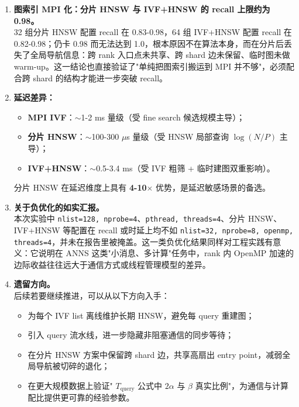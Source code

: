 \documentclass[a4paper]{article}
\begin{document}
\begin{enumerate}
    \item \textbf{图索引 MPI 化：分片 HNSW 与 IVF+HNSW 的 recall 上限约为 0.98。}\\
    32 组分片 HNSW 配置 recall 在 0.83-0.98，64 组 IVF+HNSW 配置 recall 在 0.82-0.98；仍卡 0.98 而无法达到 1.0，根本原因不在算法本身，而在分片后丢失了全局导航信息：跨 rank 入口点未共享、跨 shard 边未保留、临时图未做 warm-up。这一结论也直接验证了"单纯把图索引搬运到 MPI 并不够"，必须配合跨 shard 的结构才能进一步突破 recall。

    \item \textbf{延迟差异：}
    \begin{itemize}
        \item \textbf{MPI IVF}：$\sim$1-2 ms 量级（受 fine search 候选规模主导）；
        \item \textbf{分片 HNSW}：$\sim$100-300 $\mu$s 量级（受 HNSW 局部查询 $\log(N/P)$ 主导）；
        \item \textbf{IVF+HNSW}：$\sim$0.5-3.4 ms（受 IVF 粗筛 + 临时建图双重影响）。
    \end{itemize}
    分片 HNSW 在延迟维度上具有 \textbf{4-10$\times$} 优势，是延迟敏感场景的备选。

    \item \textbf{关于负优化的如实汇报。}\\
    本次实验中 \texttt{nlist=128, nprobe=4}、\texttt{pthread, threads=4}、分片 HNSW、IVF+HNSW 等配置在 recall 或时延上均不如 \texttt{nlist=32, nprobe=8, openmp, threads=4}，并未在报告里被掩盖。这一类负优化结果同样对工程实践有意义：它说明在 ANNS 这类"小消息、多计算"任务中，rank 内 OpenMP 加速的边际收益往往远大于通信方式或线程管理模型的差异。

    \item \textbf{遗留方向。}\\
    后续若要继续推进，可以从以下方向入手：
    \begin{itemize}
        \item 为每个 IVF list 离线维护长期 HNSW，避免每 query 重建图；
        \item 引入 query 流水线，进一步隐藏非阻塞通信的同步等待；
        \item 在分片 HNSW 方案中保留跨 shard 边，共享高扇出 entry point，减弱全局导航被切碎的退化；
        \item 在更大规模数据上验证" $T_{\text{query}}$ 公式中 $2\alpha$ 与 $\beta$ 真实比例"，为通信与计算配比提供更可靠的经验参数。
    \end{itemize}
\end{enumerate}
\end{document}
